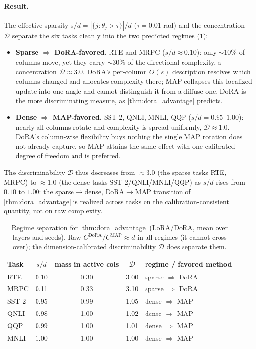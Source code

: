 \documentclass[10pt]{article}
\begin{document}
\paragraph{Result.} The effective sparsity $s/d=|\{j:\theta_j>\tau\}|/d$ ($\tau{=}0.01$
rad) and the concentration $\mathcal{D}$ separate the six tasks cleanly into the two
predicted regimes (\cref{tab:regime}):
\begin{itemize}\itemsep1pt
\item \textbf{Sparse $\Rightarrow$ DoRA-favored.} RTE and MRPC ($s/d\approx0.10$): only
${\sim}10\%$ of columns move, yet they carry ${\sim}30\%$ of the directional complexity, a
concentration $\mathcal{D}\approx3.0$. DoRA's per-column $O(s)$ description resolves
which columns changed and allocates complexity there; MAP collapses this localized
update into one angle and cannot distinguish it from a diffuse one. DoRA is the more
discriminating measure, as \cref{thm:dora_advantage} predicts.
\item \textbf{Dense $\Rightarrow$ MAP-favored.} SST-2, QNLI, MNLI, QQP ($s/d=0.95$--$1.00$):
nearly all columns rotate and complexity is spread uniformly, $\mathcal{D}\approx1.0$.
DoRA's column-wise flexibility buys nothing the single MAP rotation does not already
capture, so MAP attains the same effect with one calibrated degree of freedom and is
preferred.
\end{itemize}
The discriminability $\mathcal{D}$ thus decreases from $\approx3.0$ (the sparse tasks
RTE, MRPC) to $\approx1.0$ (the dense tasks SST-2/QNLI/MNLI/QQP) as $s/d$ rises from
$0.10$ to $1.00$: the sparse$\to$dense, DoRA$\to$MAP transition of
\cref{thm:dora_advantage} is realized across tasks on the calibration-consistent
quantity, not on raw complexity.

\begin{table}[t]
\centering
\caption{Regime separation for \cref{thm:dora_advantage} (LoRA/DoRA, mean over layers
and seeds). Raw $C^{\mathrm{DoRA}}/C^{\mathrm{MAP}}\!\approx\!d$ in all regimes (it
cannot cross over); the dimension-calibrated discriminability $\mathcal{D}$ does
separate them.}
\label{tab:regime}
\small
\begin{tabular}{lcccl}
\toprule
Task & $s/d$ & mass in active cols & $\mathcal{D}$ & regime / favored method \\
\midrule
RTE   & 0.10 & 0.30 & 3.00 & sparse $\Rightarrow$ DoRA \\
MRPC  & 0.11 & 0.33 & 3.10 & sparse $\Rightarrow$ DoRA \\
SST-2 & 0.95 & 0.99 & 1.05 & dense $\Rightarrow$ MAP \\
QNLI  & 0.98 & 1.00 & 1.02 & dense $\Rightarrow$ MAP \\
QQP   & 0.99 & 1.00 & 1.01 & dense $\Rightarrow$ MAP \\
MNLI  & 1.00 & 1.00 & 1.00 & dense $\Rightarrow$ MAP \\
\bottomrule
\end{tabular}
\end{table}
\end{document}
